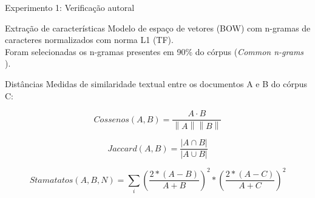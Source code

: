 \begin{frame}{Experimento 1: Verificação autoral}
\begin{block}{Extração de características}
Modelo de espaço de vetores (BOW) com n-gramas de caracteres normalizados com norma L1 (TF).\\
Foram selecionadas os n-gramas presentes em 90\% do córpus ({\it Common n-grams} \cite{Keselj2003}).
\end{block}
\begin{block}{Distâncias}
Medidas de similaridade textual entre os documentos A e B do córpus C:

\begin{equation}
Cossenos \left ( A,B \right )= \frac{A\cdot B}{\left \| A \right \| \left \| B \right \|}
\label{eq:cosseno}
\end{equation}

\begin{equation} 
Jaccard(A,B) = \frac{\left | A \cap B \right |}{\left | A \cup B \right |}
\label{eq:jaccard}
\end{equation}



\begin{equation}
Stamatatos(A,B, N) = \sum_{i} \left ( \frac{ 2*\left(A-B \right ) }{A+B}\right )^{2} * \left ( \frac{ 2*\left(A-C \right ) }{A+C}\right )^{2}
\label{eq:stamatatos}
\end{equation}
\end{block}
\end{frame}


